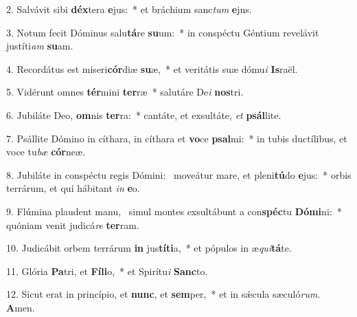 2. Salvávit sibi \textbf{déx}tera \textbf{e}jus:~*  et bráchium sanc\textit{tum} \textbf{e}jus.\

3. Notum fecit Dóminus salu\textbf{tá}re \textbf{su}um:~*  in conspéctu Géntium revelávit justíti\textit{am} \textbf{su}am.\

4. Recordátus est miseri\textbf{cór}diæ \textbf{su}æ,~*  et veritátis suæ dómu\textit{i} \textbf{Is}raël.\

5. Vidérunt omnes \textbf{tér}mini \textbf{ter}ræ~*  salutáre De\textit{i} \textbf{nos}tri.\

6. Jubiláte Deo, \textbf{om}nis \textbf{ter}ra:~*  cantáte, et exsultáte, \textit{et} \textbf{psál}lite.\

7. Psállite Dómino in cíthara, in cíthara et \textbf{vo}ce \textbf{psal}mi:~*  in tubis ductílibus, et voce tu\textit{bæ} \textbf{cór}neæ.\

8. Jubiláte in conspéctu regis Dómini: \dag\  moveátur mare, et pleni\textbf{tú}do \textbf{e}jus:~*  orbis terrárum, et qui hábitant \textit{in} \textbf{e}o.\

9. Flúmina plaudent manu, \dag\  simul montes exsultábunt a con\textbf{spéc}tu \textbf{Dó}\textbf{mi}ni:~*  quóniam venit judicá\textit{re} \textbf{ter}ram.\

10. Judicábit orbem terrárum \textbf{in} jus\textbf{tí}\textbf{ti}a,~*  et pópulos in æ\textit{qui}\textbf{tá}te.\

11. Glória \textbf{Pa}tri, et \textbf{Fí}\textbf{li}o,~*  et Spirítu\textit{i} \textbf{Sanc}to.\

12. Sicut erat in princípio, et \textbf{nunc}, et \textbf{sem}per,~*  et in sǽcula sæculó\textit{rum}. \textbf{A}men.\


